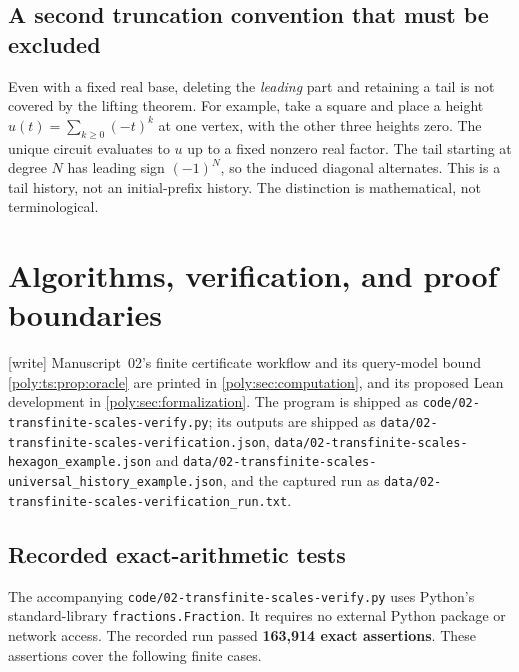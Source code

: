 \documentclass[11pt,a4paper]{article}
\numberwithin{equation}{section}
\theoremstyle{plain}
\newcommand{\wtag}{\textup{[write]}}%
\begin{document}
\subsection{A second truncation convention that must be excluded}
Even with a fixed real base, deleting the \emph{leading} part and retaining
a tail is not covered by the lifting theorem. For example, take a square
and place a height $u(t)=\sum_{k\ge0}(-t)^k$ at one vertex, with the other
three heights zero. The unique circuit evaluates to $u$ up to a fixed
nonzero real factor. The tail starting at degree $N$ has leading sign
$(-1)^N$, so the induced diagonal alternates. This is a tail history, not
an initial-prefix history. The distinction is mathematical, not terminological.

\section{Algorithms, verification, and proof boundaries}\label{poly:ts:sec:verification}

\noindent\wtag{} Manuscript~02's finite certificate workflow and its
query-model bound \cref{poly:ts:prop:oracle} are printed in
\cref{poly:sec:computation}, and its proposed Lean development in
\cref{poly:sec:formalization}. The program is shipped as
\nolinkurl{code/02-transfinite-scales-verify.py}; its outputs are shipped
as \nolinkurl{data/02-transfinite-scales-verification.json},
\nolinkurl{data/02-transfinite-scales-hexagon_example.json} and
\nolinkurl{data/02-transfinite-scales-universal_history_example.json}, and
the captured run as \nolinkurl{data/02-transfinite-scales-verification_run.txt}.

\subsection{Recorded exact-arithmetic tests}\label{poly:ts:sec:tests}
The accompanying \nolinkurl{code/02-transfinite-scales-verify.py} uses Python's standard-library
\texttt{fractions.Fraction}. It requires no external Python package or
network access. The recorded run passed \textbf{163,914 exact assertions}.
These assertions cover the following finite cases.
\end{document}

